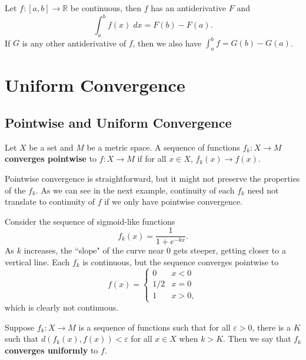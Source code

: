 \documentclass[twoside,10pt]{report}
\begin{document}
\begin{thrm}
	Let $f:[a,b]\to\mathbb{R}$ be continuous, then $f$ has an antiderivative $F$ and
	\[
		\int_{a}^{b} f(x) \;dx = F(b)-F(a).
	\] 
	If $G$ is any other antiderivative of $f$, then we also have $\int_{a}^{b} f = G(b)-G(a)$.
\end{thrm}


\chapter{Uniform Convergence}


\section{Pointwise and Uniform Convergence}

\begin{defn}[]
	Let $X$ be a set and $M$ be a metric space. A sequence of functions $f_k : X \to M$ \textbf{converges pointwise} to $f:X \to M$ if for all $x \in X$, $f_k(x) \to f(x)$.
\end{defn}

Pointwise convergence is straightforward, but it might not preserve the properties of the $f_k$. As we can see in the next example, continuity of each $f_k$ need not translate to continuity of $f$ if we only have pointwise convergence.

\begin{ex}{}{}
Consider the sequence of sigmoid-like functions
\[
	f_k(x) = \frac{1}{1+e^{-kx}} .
\] As $k$ increases, the ``slope" of the curve near 0 gets steeper, getting closer to a vertical line. Each $f_k$ is continuous, but the sequence converges pointwise to
\[
	f(x) =
	\begin{cases}
		0 & x < 0 \\
		1/2 & x=0 \\
		1 & x>0,
	\end{cases}
\] which is clearly not continuous.
\end{ex}

\begin{defn}[]
	Suppose $f_k : X \to M$ is a sequence of functions such that for all $\varepsilon>0$, there is a $K$ such that $d(f_k(x), f(x)) < \varepsilon$ for all $x \in X$ when $k > K$. Then we say that $f_k$ \textbf{converges uniformly} to $f$.
\end{defn}
\end{document}
